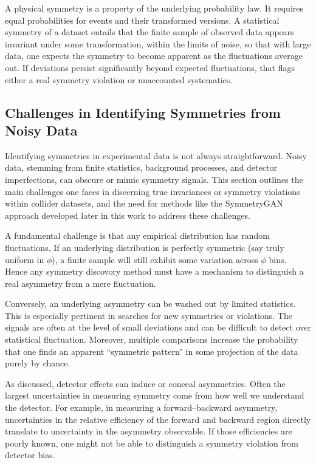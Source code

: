             A physical symmetry is a property of the underlying probability law.
            It requires equal probabilities for events and their transformed versions.
            A statistical symmetry of a dataset entails that the finite sample of observed data appears invariant under some transformation, within the limits of noise, so that with large data, one expects the symmetry to become apparent as the fluctuations average out.
            If deviations persist significantly beyond expected fluctuations, that flags either a real symmetry violation or unaccounted systematics.
            

    \subsection{Challenges in Identifying Symmetries from Noisy Data}
    \label{subsec:noisy-symmetries}
        Identifying symmetries in experimental data is not always straightforward.
        Noisy data, stemming from finite statistics, background processes, and detector imperfections, can obscure or mimic symmetry signals.
        This section outlines the main challenges one faces in discerning true invariances or symmetry violations within collider datasets, and the need for methods like the SymmetryGAN approach developed later in this work to address these challenges.

        A fundamental challenge is that any empirical distribution has random fluctuations.
        If an underlying distribution is perfectly symmetric (say truly uniform in $\phi$), a finite sample will still exhibit some variation across $\phi$ bins.
        Hence any symmetry discovory method must have a mechanism to distinguish a real asymmetry from a mere fluctuation.
        
        Conversely, an underlying asymmetry can be washed out by limited statistics.
        This is especially pertinent in searches for new symmetries or violations.
        The signals are often at the level of small deviations and can be difficult to detect over statistical fluctuation.
        Moreover, multiple comparisons increase the probability that one finds an apparent ``symmetric pattern" in some projection of the data purely by chance.

        As discussed, detector effects can induce or conceal asymmetries.
        Often the largest uncertainties in measuring symmetry come from how well we understand the detector.
        For example, in measuring a forward--backward asymmetry, uncertainties in the relative efficiency of the forward and backward region directly translate to uncertainty in the asymmetry observable.
        If those efficiencies are poorly known, one might not be able to distinguish a symmetry violation from detector bias.
        
